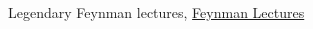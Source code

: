 \begin{thebibliography}{99.}%


 Legendary Feynman lectures,  \href{https://www.feynmanlectures.caltech.edu/I_52.html}{Feynman Lectures}

\end{thebibliography}

